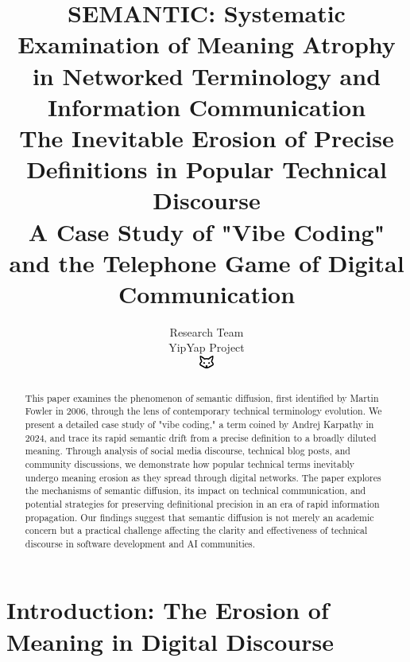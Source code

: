 \documentclass[11pt]{article}
\begin{document}
\title{\textbf{SEMANTIC: Systematic Examination of Meaning Atrophy in Networked Terminology and Information Communication} \\
\Large{The Inevitable Erosion of Precise Definitions in Popular Technical Discourse} \\
\large{A Case Study of "Vibe Coding" and the Telephone Game of Digital Communication}}

\author{Research Team\\
YipYap Project\\
\includegraphics[width=0.5cm]{favicon.pdf}}

\maketitle

\begin{abstract}
This paper examines the phenomenon of semantic diffusion, first identified by Martin Fowler in 2006, through the lens of contemporary technical terminology evolution. We present a detailed case study of "vibe coding," a term coined by Andrej Karpathy in 2024, and trace its rapid semantic drift from a precise definition to a broadly diluted meaning. Through analysis of social media discourse, technical blog posts, and community discussions, we demonstrate how popular technical terms inevitably undergo meaning erosion as they spread through digital networks. The paper explores the mechanisms of semantic diffusion, its impact on technical communication, and potential strategies for preserving definitional precision in an era of rapid information propagation. Our findings suggest that semantic diffusion is not merely an academic concern but a practical challenge affecting the clarity and effectiveness of technical discourse in software development and AI communities.
\end{abstract}

\tableofcontents
\newpage

\section{Introduction: The Erosion of Meaning in Digital Discourse}
\end{document}
